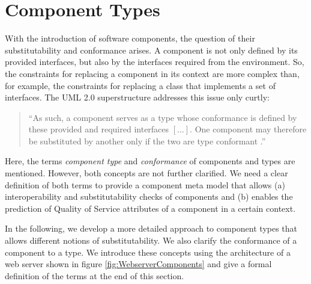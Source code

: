 \section{Component Types}
With the introduction of software components, the question of their substitutability and conformance arises. A component is not only defined by its provided interfaces, but also by the interfaces required from the environment. So, the constraints for replacing a component in its context are more complex than, for example, the constraints for replacing a class that implements a set of interfaces. The UML 2.0 superstructure addresses this issue only curtly:

\begin{quote}
``As such, a component serves as a type whose conformance is defined by these provided and required interfaces $[\ldots]$. One component may therefore be substituted by another only if the two are type conformant \cite[p.142]{OMGUML2005a}.''
\end{quote}

Here, the terms \emph{component type} and \emph{conformance} of components and types are mentioned. However, both concepts are not further clarified. We need a clear definition of both terms to provide a component meta model that allows (a)  interoperability and substitutability checks of components and (b) enables the prediction of Quality of Service attributes of a component in a certain context.

In the following, we develop a more detailed approach to component types that allows different notions of substitutability. We also clarify the conformance of a component to a type. We introduce these concepts using the architecture of a web server shown in figure \ref{fig:WebserverComponents} and give a formal definition of the terms at the end of this section.


